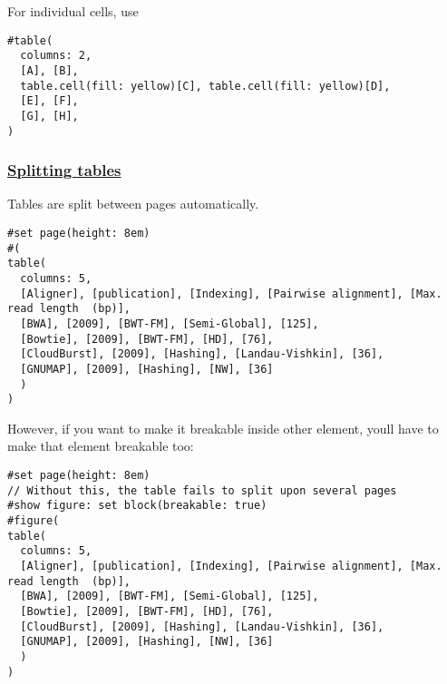 \pandocbounded{}

For individual cells, use

\begin{verbatim}
#table(
  columns: 2,
  [A], [B],
  table.cell(fill: yellow)[C], table.cell(fill: yellow)[D],
  [E], [F],
  [G], [H],
)
\end{verbatim}

\pandocbounded{}

\subsubsection{\texorpdfstring{\hyperref[splitting-tables]{Splitting
tables}}{Splitting tables}}\label{splitting-tables}

Tables are split between pages automatically.

\begin{verbatim}
#set page(height: 8em)
#(
table(
  columns: 5,
  [Aligner], [publication], [Indexing], [Pairwise alignment], [Max. read length  (bp)],
  [BWA], [2009], [BWT-FM], [Semi-Global], [125],
  [Bowtie], [2009], [BWT-FM], [HD], [76],
  [CloudBurst], [2009], [Hashing], [Landau-Vishkin], [36],
  [GNUMAP], [2009], [Hashing], [NW], [36]
  )
)
\end{verbatim}

\pandocbounded{}

\pandocbounded{}

However, if you want to make it breakable inside other element,
you\textquotesingle ll have to make that element breakable too:

\begin{verbatim}
#set page(height: 8em)
// Without this, the table fails to split upon several pages
#show figure: set block(breakable: true)
#figure(
table(
  columns: 5,
  [Aligner], [publication], [Indexing], [Pairwise alignment], [Max. read length  (bp)],
  [BWA], [2009], [BWT-FM], [Semi-Global], [125],
  [Bowtie], [2009], [BWT-FM], [HD], [76],
  [CloudBurst], [2009], [Hashing], [Landau-Vishkin], [36],
  [GNUMAP], [2009], [Hashing], [NW], [36]
  )
)
\end{verbatim}

